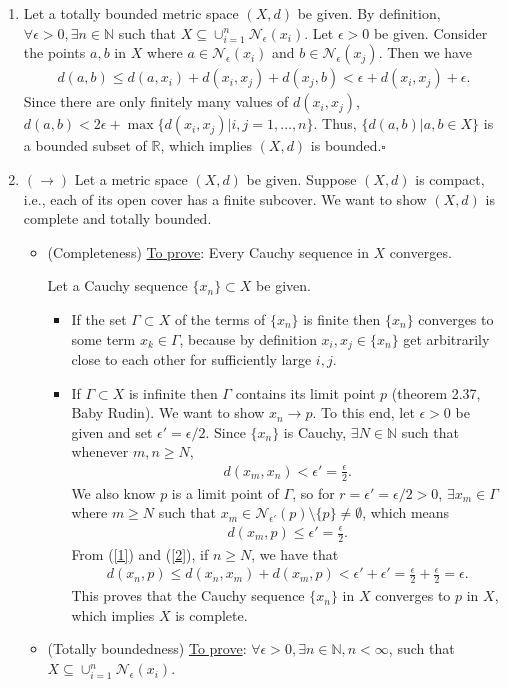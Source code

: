\documentclass{article}
\begin{document}
\begin{enumerate}
	\item Let a totally bounded metric space $(X,d)$ be given. By definition, $\forall \epsilon > 0, \exists n\in \mathbb{N}$ such that $X \subseteq \cup^n_{i=1}\mathcal{N}_\epsilon(x_i)$. Let $\epsilon > 0$ be given. Consider the points $a,b$ in $X$ where $a\in \mathcal{N}_\epsilon(x_i)$ and $b \in \mathcal{N}_\epsilon(x_j)$. Then we have
	\begin{align*}
	d(a,b) \leq d(a,x_i) + d(x_i,x_j) + d(x_j,b) < \epsilon + d(x_i,x_j) + \epsilon.
	\end{align*}
	Since there are only finitely many values of $d(x_i,x_j)$, $d(a,b) < 2\epsilon + \max\{ d(x_i,x_j)| i,j = 1,\dots,n \}$. Thus, $\{d(a,b)| a,b \in X\}$ is a bounded subset of $\mathbb{R}$, which implies $(X,d)$ is bounded.\hfill $\square$
	\item  $(\rightarrow)$ Let a metric space $(X,d)$ be given. Suppose $(X,d)$ is compact, i.e., each of its open cover has a finite subcover. We want to show $(X,d)$ is complete and totally bounded. 
	\begin{itemize}
		\item (Completeness) \underline{To prove}: Every Cauchy sequence in $X$ converges. 
		
		Let a Cauchy sequence $\{x_n\} \subset X$ be given. 
		\begin{itemize}
			\item If the set $\Gamma \subset X$ of the terms of $\{x_n\}$ is finite then $\{x_n\}$ converges to some term $x_k\in\Gamma$, because by definition $x_i,x_j \in \{x_n\}$ get arbitrarily close to each other for sufficiently large $i,j$. 
			\item If $\Gamma \subset X$ is infinite then $\Gamma$ contains its limit point $p$ (theorem 2.37, Baby Rudin). We want to show $x_n \to p$. To this end, let $\epsilon > 0$ be given and set $\epsilon' = \epsilon/2$. Since $\{x_n\}$ is Cauchy, $\exists N \in \mathbb{N}$ such that whenever $m,n \geq N$, 
			\begin{align}\label{1}
			d(x_m,x_n) < \epsilon' = \frac{\epsilon}{2}.
			\end{align}
			We also know $p$ is a limit point of $\Gamma$, so for $r = \epsilon' = \epsilon/2 > 0$, $\exists x_m \in \Gamma$ where $m \geq N$ such that $x_m \in \mathcal{N}_{\epsilon'}(p)\setminus\{p\} \neq \emptyset$, which means
			\begin{align}\label{2}
			d(x_m,p) \leq \epsilon' = \frac{\epsilon}{2}.
			\end{align}
			From (\ref{1}) and (\ref{2}), if $n \geq N$, we have that
			\begin{align*}
			d(x_n,p) \leq d(x_n,x_m) + d(x_m,p) < \epsilon' + \epsilon' = \frac{\epsilon}{2} + \frac{\epsilon}{2} = \epsilon.
			\end{align*}
			This proves that the Cauchy sequence $\{x_n\}$ in $X$ converges to $p$ in $X$, which implies $X$ is complete.  
		\end{itemize}
		\item (Totally boundedness) \underline{To prove}: $\forall \epsilon > 0, \exists n \in \mathbb{N}, n < \infty$, such that $X \subseteq \cup^{n}_{i=1}\mathcal{N}_\epsilon(x_i)$.  
		

\end{itemize}
\end{enumerate}
\end{document}
